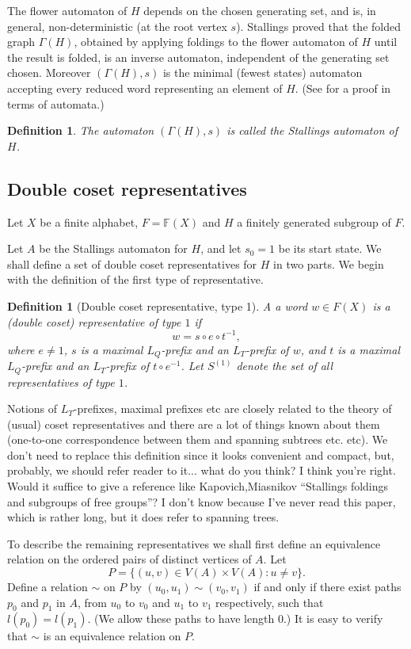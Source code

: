 \documentclass[a4paper,12pt]{article}
\newcommand{\G}{\Gamma }
\newtheorem{definition}[theorem]{Definition}
\numberwithin{equation}{section}
\numberwithin{figure}{section}
\newcommand{\FF}{\ensuremath{\mathbb{F}}}
\begin{document}
The flower automaton of $H$ depends on the chosen generating set, and is, 
in general,
non-deterministic (at the root vertex $s$). Stallings \cite{stallings83} 
proved that the folded graph $\G(H)$, obtained by applying foldings to the 
flower automaton of $H$ until the result is folded, is an inverse
automaton, independent of the generating set chosen.
Moreover  $(\G(H),s)$ is the minimal (fewest states) automaton accepting 
every reduced word representing an element of $H$. (See \cite{BartholdiSilva} 
for a proof in terms of automata.)
\begin{definition}
The automaton $(\G(H),s)$ is  called the {\em Stallings automaton} of $H$. 
\end{definition}
\subsection{Double coset representatives}\label{sub:2cosetrepr}
Let $X$ be a finite alphabet, $F=\FF(X)$ and $H$ a finitely generated subgroup
of $F$. 

Let $A$ be the Stallings automaton for $H$, and let  $s_0 =
1$ be its start state. 
We shall define a set of double coset representatives for $H$ in two parts.
We begin with the definition of the first type of representative. 
\begin{definition}[Double coset representative, type 1]
A a word $w\in F(X)$ is a {\em (double coset) representative of type} $1$ if
\[w=s\circ e \circ t^{-1},\]
where $e\neq 1$, $s$ is a maximal $L_Q$-prefix and an $L_T$-prefix of $w$, 
and $t$ is a maximal $L_Q$-prefix and an 
$L_T$-prefix of $t\circ e^{-1}$. Let $S^{(1)}$ denote the set of all representatives of type $1$.
\end{definition}

{\ef Notions of $L_T$-prefixes, maximal prefixes etc are closely related to the theory of (usual) coset
 representatives and there are a lot of things known about them (one-to-one correspondence between them and spanning subtrees etc. etc).
 We don't need to replace this definition since it looks convenient and compact, but, probably, we should refer reader to it... what do you think?
}
{\ajd I think you're right. Would it suffice to give a reference like
Kapovich,Miasnikov ``Stallings foldings and subgroups of free groups''?
I don't know because I've never read this paper, which is rather long,
but it does refer to spanning trees.} 



To describe the remaining representatives we shall first define an equivalence
relation on the ordered pairs of distinct vertices of $A$. Let
\[P=\{(u,v)\in V(A)\times V(A): u\neq v\}.\]
Define a relation $\sim$ on $P$ by $(u_0,u_1)\sim (v_0,v_1)$ if and only if
there exist paths $p_0$ and $p_1$ in $A$, from $u_0$ to $v_0$ and $u_1$ to $v_1$
respectively, such that $l(p_0)=l(p_1)$. (We allow these paths to have length $0$.)
It is easy to verify that $\sim$ is an equivalence relation on $P$.
\end{document}
